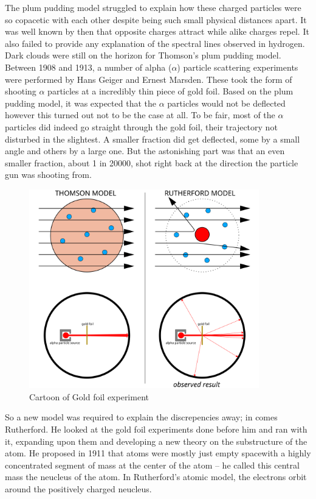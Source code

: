 The plum pudding model struggled to explain how these charged particles were so copacetic with each other despite being such small physical distances apart.
It was well known by then that opposite charges attract while alike charges repel.
It also failed to provide any explanation of the spectral lines observed in hydrogen.
Dark clouds were still on the horizon for Thomson's plum pudding model.
Between 1908 and  1913, a number of alpha ($\alpha$) particle scattering experiments were performed by Hans Geiger and Ernest Marsden.
These took the form of shooting $\alpha$  particles at a  incredibly thin piece of gold foil.
Based on the plum pudding model, it was expected that the $\alpha$ particles would not be deflected however this turned out not to be the case at all.
To be fair, most of the $\alpha$ particles did indeed go straight through the gold foil, their trajectory not disturbed in the slightest.
A smaller fraction did get deflected, some by a small angle and others by a large one.
But the astonishing part was that an even smaller fraction, about 1 in 20000, shot right back at the direction the particle gun was shooting from.

\begin{figure}[H]
  \centering
  \includegraphics[width=100mm]{figures/goldFoil.png}
  \caption{Cartoon of Gold foil experiment}
  \label{goldFoil}
\end{figure}

So a new model was required to explain the discrepencies away; in comes Rutherford.
He looked at the gold foil experiments done before him and ran with it, expanding upon them and developing a new theory on the substructure of the atom.
He proposed in 1911 that atoms were mostly just empty spacewith a highly concentrated segment of mass at the center of the atom -- he called this central mass the neucleus of the atom.
In Rutherford's atomic model, the electrons orbit around the positively charged neucleus.

